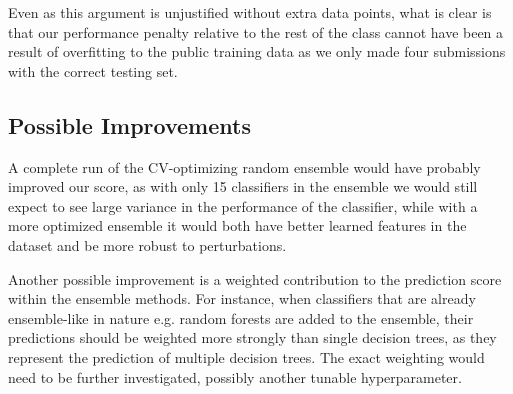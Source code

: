 \documentclass[10pt]{article}
\begin{document}
Even as this argument is unjustified without extra data points, what is clear is that our performance penalty relative to the rest of the class cannot have been a result of overfitting to the public training data as we only made four submissions with the correct testing set.

\subsection{Possible Improvements}

A complete run of the CV-optimizing random ensemble would have probably improved our score, as with only 15 classifiers in the ensemble we would still expect to see large variance in the performance of the classifier, while with a more optimized ensemble it would both have better learned features in the dataset and be more robust to perturbations.

Another possible improvement is a weighted contribution to the prediction score within the ensemble methods. For instance, when classifiers that are already ensemble-like in nature e.g. random forests are added to the ensemble, their predictions should be weighted more strongly than single decision trees, as they represent the prediction of multiple decision trees. The exact weighting would need to be further investigated, possibly another tunable hyperparameter.
\end{document}
